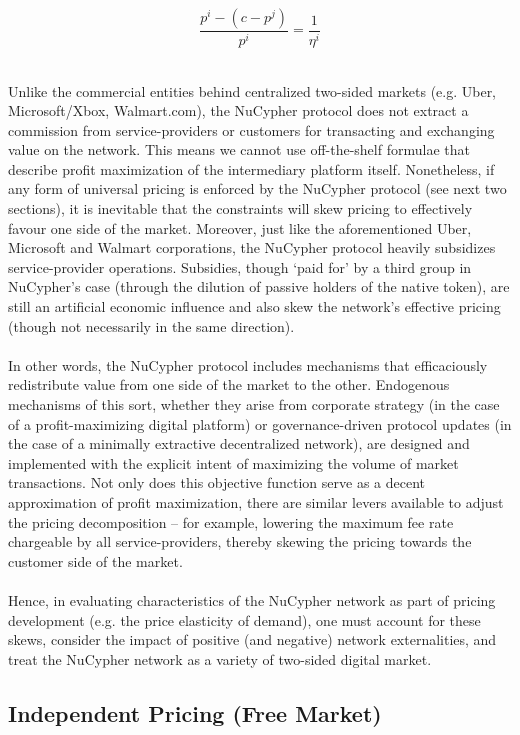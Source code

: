 \documentclass[longbibliography,nofootinbib]{revtex4-1}
\begin{document}
\begin{equation}
    \frac{p^i - (c - p^j)}{p^i} = \frac{1}{\eta^i}   
\end{equation} \

Unlike the commercial entities behind centralized two-sided markets (e.g. Uber, Microsoft/Xbox, Walmart.com), the NuCypher protocol does not extract a commission from service-providers or customers for transacting and exchanging value on the network. This means we cannot use off-the-shelf formulae that describe profit maximization of the intermediary platform itself. Nonetheless, if any form of universal pricing is enforced by the NuCypher protocol (see next two sections), it is inevitable that the constraints will skew pricing to effectively favour one side of the market. Moreover, just like the aforementioned Uber, Microsoft and Walmart corporations, the NuCypher protocol heavily subsidizes service-provider operations. Subsidies, though ‘paid for’ by a third group in NuCypher’s case (through the dilution of passive holders of the native token), are still an artificial economic influence and also skew the network’s effective pricing (though not necessarily in the same direction). 
\\\\
In other words, the NuCypher protocol includes mechanisms that efficaciously redistribute value from one side of the market to the other. Endogenous mechanisms of this sort, whether they arise from corporate strategy (in the case of a profit-maximizing digital platform) or governance-driven protocol updates (in the case of a minimally extractive decentralized network), are designed and implemented with the explicit intent of maximizing the volume of market transactions. Not only does this objective function serve as a decent approximation of profit maximization, there are similar levers available to adjust the pricing decomposition – for example, lowering the maximum fee rate chargeable by all service-providers, thereby skewing the pricing towards the customer side of the market. 
\\\\
Hence, in evaluating characteristics of the NuCypher network as part of pricing development (e.g. the price elasticity of demand), one must account for these skews, consider the impact of positive (and negative) network externalities, and treat the NuCypher network as a variety of two-sided digital market. 

\subsection{Independent Pricing (Free Market)}
\end{document}
